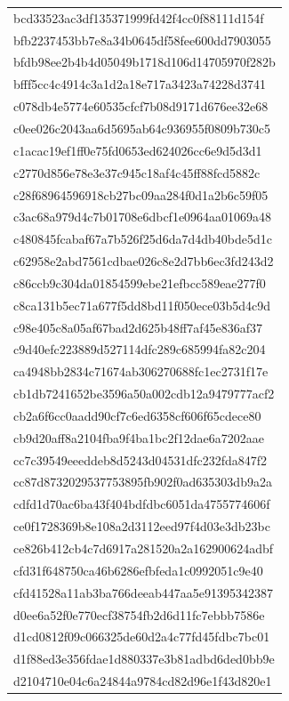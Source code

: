 \begin{tabular}{l}
bcd33523ac3df135371999fd42f4cc0f88111d154f \\
bfb2237453bb7e8a34b0645df58fee600dd7903055 \\
bfdb98ee2b4b4d05049b1718d106d14705970f282b \\
bfff5cc4c4914c3a1d2a18e717a3423a74228d3741 \\
c078db4e5774e60535cfcf7b08d9171d676ee32e68 \\
c0ee026c2043aa6d5695ab64c936955f0809b730c5 \\
c1acac19ef1ff0e75fd0653ed624026cc6e9d5d3d1 \\
c2770d856e78e3e37c945c18af4c45ff88fcd5882c \\
c28f68964596918cb27bc09aa284f0d1a2b6c59f05 \\
c3ac68a979d4c7b01708e6dbcf1e0964aa01069a48 \\
c480845fcabaf67a7b526f25d6da7d4db40bde5d1c \\
c62958e2abd7561cdbae026c8e2d7bb6ec3fd243d2 \\
c86ccb9c304da01854599ebe21efbcc589eae277f0 \\
c8ca131b5ec71a677f5dd8bd11f050ece03b5d4c9d \\
c98e405c8a05af67bad2d625b48ff7af45e836af37 \\
c9d40efc223889d527114dfc289c685994fa82c204 \\
ca4948bb2834c71674ab306270688fc1ec2731f17e \\
cb1db7241652be3596a50a002cdb12a9479777acf2 \\
cb2a6f6cc0aadd90cf7c6ed6358cf606f65cdece80 \\
cb9d20aff8a2104fba9f4ba1bc2f12dae6a7202aae \\
cc7c39549eeeddeb8d5243d04531dfc232fda847f2 \\
cc87d8732029537753895fb902f0ad635303db9a2a \\
cdfd1d70ac6ba43f404bdfdbc6051da4755774606f \\
ce0f1728369b8e108a2d3112eed97f4d03e3db23bc \\
ce826b412cb4c7d6917a281520a2a162900624adbf \\
cfd31f648750ca46b6286efbfeda1c0992051c9e40 \\
cfd41528a11ab3ba766deeab447aa5e91395342387 \\
d0ee6a52f0e770ecf38754fb2d6d11fc7ebbb7586e \\
d1cd0812f09c066325de60d2a4c77fd45fdbc7bc01 \\
d1f88ed3e356fdae1d880337e3b81adbd6ded0bb9e \\
d2104710e04c6a24844a9784cd82d96e1f43d820e1 \\

\end{tabular}
